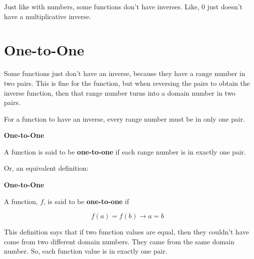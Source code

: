 \documentclass{ximera}
\begin{document}
Just like with numbers, some functions don't have inverses.  Like, $0$ just doesn't have a multiplicative inverse.






\section*{One-to-One}


Some functions just don't have an inverse, because they have a range number in two pairs.  This is fine for the function, but when reversing the pairs to obtain the inverse function, then that range number turns into a domain number in two pairs.


For a function to have an inverse, every range number must be in only one pair.



\begin{definition} \textbf{\textcolor{green!50!black}{One-to-One}}    


A function is said to be \textbf{one-to-one} if each range number is in exactly one pair.


\end{definition}



Or, an equivalent definition:

\begin{definition} \textbf{\textcolor{green!50!black}{One-to-One}}   


A function, $f$, is said to be \textbf{one-to-one} if 


\[    f(a) = f(b) \rightarrow a = b           \]


\end{definition}





This definition says that if two function values are equal, then they couldn't have come from two different domain numbers.  They came from the same domain number. So, each function value is in exactly one pair.
\end{document}
